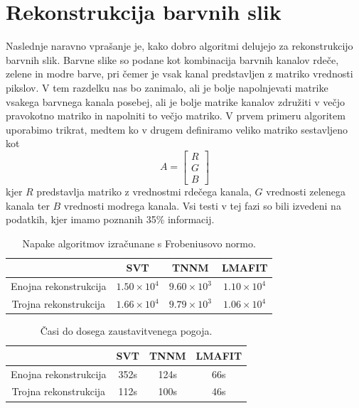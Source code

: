 \section{Rekonstrukcija barvnih slik} \label{1307-2252}
Naslednje naravno vprašanje je, kako dobro algoritmi delujejo za rekonstrukcijo barvnih slik. Barvne slike so podane kot kombinacija barvnih kanalov rdeče, zelene in modre barve, pri čemer je vsak kanal predstavljen z matriko vrednosti pikslov. V tem razdelku nas bo zanimalo, ali je bolje napolnjevati matrike vsakega barvnega kanala posebej, ali je bolje matrike kanalov združiti v večjo pravokotno matriko in napolniti to večjo matriko. V prvem primeru algoritem uporabimo trikrat, medtem ko v drugem definiramo veliko matriko sestavljeno kot
\[
    A = \begin{bmatrix}
        R \\G\\B
    \end{bmatrix}
\]
kjer $R$ predstavlja matriko z vrednostmi rdečega kanala, $G$ vrednosti zelenega kanala ter $B$ vrednosti modrega kanala.
Vsi testi v tej fazi so bili izvedeni na podatkih, kjer imamo poznanih 35\% informacij.
\begin{table}[h]
    \centering
    \begin{tabular}{|c|c|c|c|}
        \hline
                              & SVT                & TNNM              & LMAFIT             \\
        \hline
        Enojna rekonstrukcija & $1.50 \times 10^4$ & $9.60\times 10^3$ & $1.10 \times 10^4$ \\
        Trojna rekonstrukcija & $1.66\times 10^4$  & $9.79\times 10^3$ & $1.06 \times 10^4$ \\
        \hline
    \end{tabular}
    \caption{Napake algoritmov izračunane s Frobeniusovo normo.}
    \label{1307-1550}
\end{table}

\begin{table}[h]
    \centering
    \begin{tabular}{|c|c|c|c|}
        \hline
                              & SVT  & TNNM & LMAFIT \\
        \hline
        Enojna rekonstrukcija & 352s & 124s & 66s    \\
        Trojna rekonstrukcija & 112s & 100s & 46s    \\
        \hline
    \end{tabular}
    \caption{Časi do dosega zaustavitvenega pogoja.}
    \label{1307-1551}
\end{table}

